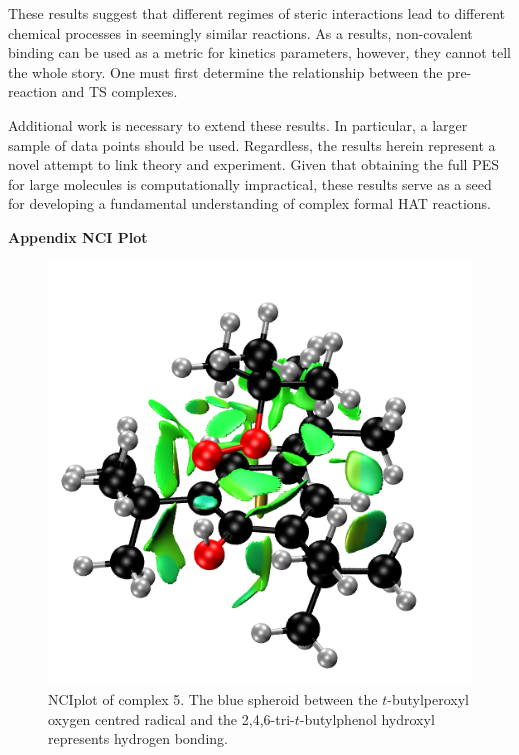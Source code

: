 These results suggest that different regimes of steric interactions lead to different chemical processes in seemingly similar reactions. As a results, non-covalent binding can be used as a metric for kinetics parameters, however, they cannot tell the whole story. One must first determine the relationship between the pre-reaction and TS complexes.

Additional work is necessary to extend these results. In particular, a larger sample of data points should be used. Regardless, the results herein represent a novel attempt to link theory and experiment. Given that obtaining the full PES for large molecules is computationally impractical, these results serve as a seed for developing a fundamental understanding of complex formal HAT reactions.

\newpage
\noindent \textbf{Appendix NCI Plot}
\begin{figure}[htb]
  \centering
  \includegraphics[width=\textwidth]{figures/nciplot.png}
  \caption{NCIplot\cite{Johnson2010,ContrerasGarcia2011} of complex 5. The blue spheroid between the $t$-butylperoxyl oxygen centred radical and the 2,4,6-tri-$t$-butylphenol hydroxyl represents hydrogen bonding.}
\end{figure}
